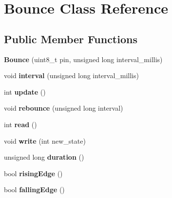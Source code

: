 \hypertarget{class_bounce}{}\section{Bounce Class Reference}
\label{class_bounce}
\subsection*{Public Member Functions}
\begin{DoxyCompactItemize}
\item 
\hypertarget{class_bounce_ab34517094faf21d4f38b36da2915132b}{}{\bfseries Bounce} (uint8\+\_\+t pin, unsigned long interval\+\_\+millis)\label{class_bounce_ab34517094faf21d4f38b36da2915132b}

\item 
\hypertarget{class_bounce_a952fd33da52d169784b4bac37846c808}{}void {\bfseries interval} (unsigned long interval\+\_\+millis)\label{class_bounce_a952fd33da52d169784b4bac37846c808}

\item 
\hypertarget{class_bounce_a5044403b77e2751adc13fffe984b8b65}{}int {\bfseries update} ()\label{class_bounce_a5044403b77e2751adc13fffe984b8b65}

\item 
\hypertarget{class_bounce_add7fe88ebe6b8bbcc7528701d2914457}{}void {\bfseries rebounce} (unsigned long interval)\label{class_bounce_add7fe88ebe6b8bbcc7528701d2914457}

\item 
\hypertarget{class_bounce_ae50a234cdadfac51ef8ebc6011b1c702}{}int {\bfseries read} ()\label{class_bounce_ae50a234cdadfac51ef8ebc6011b1c702}

\item 
\hypertarget{class_bounce_a4f51731e4c1c5c73a522056ccb87d5d0}{}void {\bfseries write} (int new\+\_\+state)\label{class_bounce_a4f51731e4c1c5c73a522056ccb87d5d0}

\item 
\hypertarget{class_bounce_a62412d814d36102ab3d285e801d5d29a}{}unsigned long {\bfseries duration} ()\label{class_bounce_a62412d814d36102ab3d285e801d5d29a}

\item 
\hypertarget{class_bounce_a3417beb80eb6593d768c2e9884c57aa0}{}bool {\bfseries rising\+Edge} ()\label{class_bounce_a3417beb80eb6593d768c2e9884c57aa0}

\item 
\hypertarget{class_bounce_ac756559419bfa1c5060e5e4a4ad6406f}{}bool {\bfseries falling\+Edge} ()\label{class_bounce_ac756559419bfa1c5060e5e4a4ad6406f}

\end{DoxyCompactItemize}
